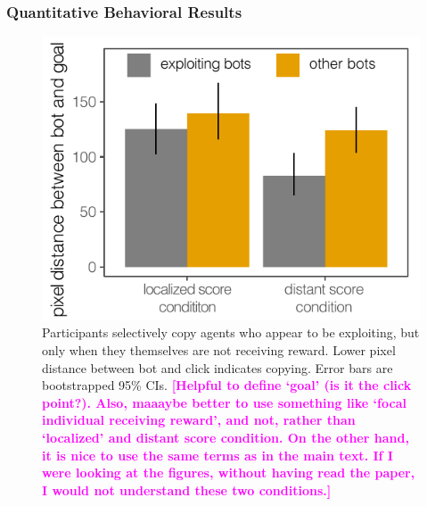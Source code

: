 \documentclass[12pt,letterpaper]{article}
\newcommand{\andrew}[1]{\textcolor{magenta}{\bf [#1]}}
\begin{document}
\subsubsection{Quantitative Behavioral Results}

\begin{figure}
    \centering
    \includegraphics[width=0.8 \linewidth]{figures/proximity.pdf}
    \vspace{-1em}
    \caption{Participants selectively copy agents who appear to be exploiting, but only when they themselves are not receiving reward. Lower pixel distance between bot and click indicates copying. Error bars are bootstrapped 95\% CIs.  \andrew{Helpful to define `goal' (is it the click point?). Also, maaaybe better to use something like `focal individual receiving reward', and not, rather than `localized' and distant score condition.  On the other hand, it is nice to use the same terms as in the main text. If I were looking at the figures, without having read the paper, I would not understand these two conditions.}}
    \label{fig:proximity}
\end{figure}
\end{document}
